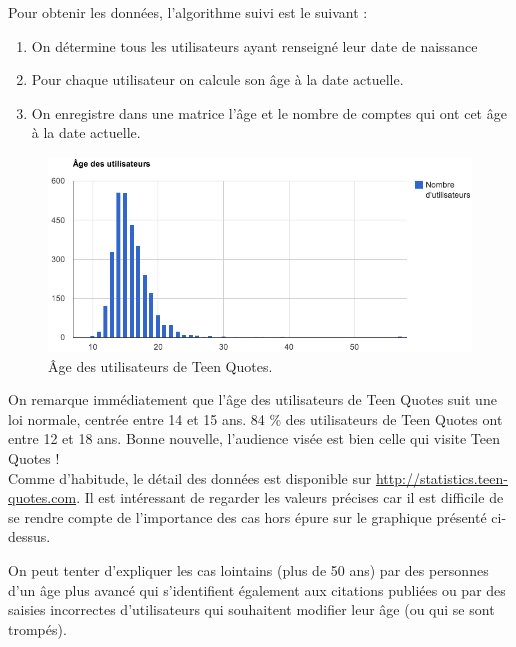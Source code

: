 \documentclass{report}
\begin{document}
	Pour obtenir les données, l'algorithme suivi est le suivant :
	\vspace{10px}
	\begin{enumerate}
		\item On détermine tous les utilisateurs ayant renseigné leur date de naissance
		\item Pour chaque utilisateur on calcule son âge à la date actuelle.
		\item On enregistre dans une matrice l'âge et le nombre de comptes qui ont cet âge à la date actuelle.
	\end{enumerate}
	\vspace{10px}
	\begin{figure}[H]
		\center
		\includegraphics[width=450px]{images/ageUtilisateurs.png}
		\caption{Âge des utilisateurs de Teen Quotes.}
	\end{figure}
	On remarque immédiatement que l'âge des utilisateurs de Teen Quotes suit une loi normale, centrée entre 14 et 15 ans. 84 \% des utilisateurs de Teen Quotes ont entre 12 et 18 ans. Bonne nouvelle, l'audience visée est bien celle qui visite Teen Quotes !\\

	Comme d'habitude, le détail des données est disponible sur \url{http://statistics.teen-quotes.com}. Il est intéressant de regarder les valeurs précises car il est difficile de se rendre compte de l'importance des cas hors épure sur le graphique présenté ci-dessus.

	On peut tenter d'expliquer les cas lointains (plus de 50 ans) par des personnes d'un âge plus avancé qui s'identifient également aux citations publiées ou par des saisies incorrectes d'utilisateurs qui souhaitent modifier leur âge (ou qui se sont trompés).

\end{document}
